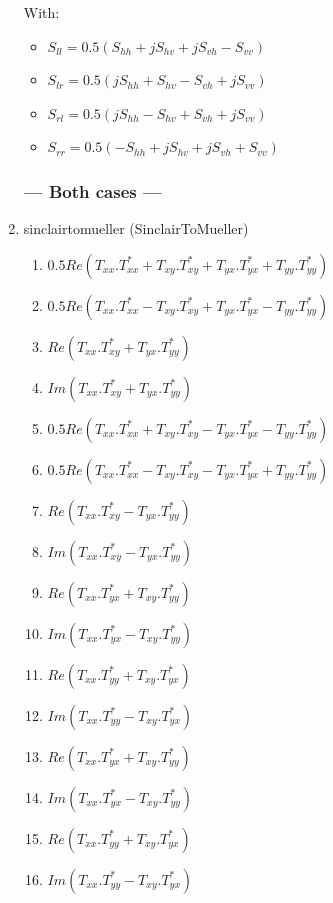 \begin{enumerate}
With:
\begin{itemize} 
\item $ S_{ll} = 0.5(S_{hh}+j S_{hv}+j S_{vh}-S_{vv}) $ 
\item $ S_{lr} = 0.5(j S_{hh}+S_{hv}-S_{vh}+j S_{vv}) $ 
\item $ S_{rl} = 0.5(j S_{hh}-S_{hv}+ S_{vh}+j S_{vv}) $ 
\item $ S_{rr} = 0.5(-S_{hh}+j S_{hv}+j S_{vh}+S_{vv}) $ 
\end{itemize}
 


\subsubsection{--- Both cases ---}

\item sinclairtomueller (SinclairToMueller)
\begin{enumerate} 
\item $ 0.5 Re( T_{xx}.T_{xx}^{*} + T_{xy}.T_{xy}^{*} + T_{yx}.T_{yx}^{*} + T_{yy}.T_{yy}^{*} ) $ 
\item $ 0.5 Re( T_{xx}.T_{xx}^{*} - T_{xy}.T_{xy}^{*} + T_{yx}.T_{yx}^{*} - T_{yy}.T_{yy}^{*} ) $ 
\item $ Re( T_{xx}.T_{xy}^{*} + T_{yx}.T_{yy}^{*} ) $ 
\item $ Im( T_{xx}.T_{xy}^{*} + T_{yx}.T_{yy}^{*} ) $ 
\item $ 0.5 Re( T_{xx}.T_{xx}^{*} + T_{xy}.T_{xy}^{*} - T_{yx}.T_{yx}^{*} - T_{yy}.T_{yy}^{*} ) $ 
\item $ 0.5 Re( T_{xx}.T_{xx}^{*} - T_{xy}.T_{xy}^{*} - T_{yx}.T_{yx}^{*} + T_{yy}.T_{yy}^{*} ) $ 
\item $ Re( T_{xx}.T_{xy}^{*} - T_{yx}.T_{yy}^{*} ) $ 
\item $ Im( T_{xx}.T_{xy}^{*} - T_{yx}.T_{yy}^{*} ) $ 
\item $ Re( T_{xx}.T_{yx}^{*} + T_{xy}.T_{yy}^{*} ) $ 
\item $ Im( T_{xx}.T_{yx}^{*} - T_{xy}.T_{yy}^{*} ) $ 
\item $ Re( T_{xx}.T_{yy}^{*} + T_{xy}.T_{yx}^{*} ) $ 
\item $ Im( T_{xx}.T_{yy}^{*} - T_{xy}.T_{yx}^{*} ) $ 
\item $ Re( T_{xx}.T_{yx}^{*} + T_{xy}.T_{yy}^{*} ) $ 
\item $ Im( T_{xx}.T_{yx}^{*} - T_{xy}.T_{yy}^{*} ) $ 
\item $ Re( T_{xx}.T_{yy}^{*} + T_{xy}.T_{yx}^{*} ) $ 
\item $ Im( T_{xx}.T_{yy}^{*} - T_{xy}.T_{yx}^{*} ) $
\end{enumerate}


\end{enumerate}
